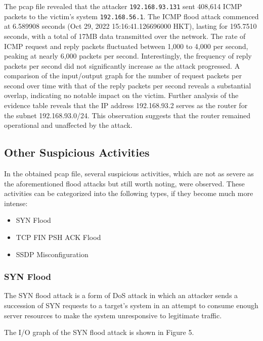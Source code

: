 \documentclass{article}
\begin{document}
    The pcap file revealed that the attacker \lstinline|192.168.93.131| sent 408,614 ICMP packets to the victim's system \lstinline|192.168.56.1|.
    The ICMP flood attack commenced at 6.589908 seconds (Oct 29, 2022 15:16:41.126696000 HKT), lasting for 195.7510 seconds, with a total of 17MB data transmitted over the network. 
    The rate of ICMP request and reply packets fluctuated between 1,000 to 4,000 per second, peaking at nearly 6,000 packets per second. 
    Interestingly, the frequency of reply packets per second did not significantly increase as the attack progressed. 
    A comparison of the input/output graph for the number of request packets per second over time with that of the reply packets per second reveals a substantial overlap, indicating no notable impact on the victim.
    Further analysis of the evidence table reveals that the IP address 192.168.93.2 serves as the router for the subnet 192.168.93.0/24. 
    This observation suggests that the router remained operational and unaffected by the attack.

    \subsection{\fontsize{14pt}{17pt}\selectfont Other Suspicious Activities}\label{subsec:other-suspicious-activities}
    In the obtained pcap file, several suspicious activities, 
    which are not as severe as the aforementioned flood attacks but still worth noting, were observed.
    These activities can be categorized into the following types, if they become much more intense:

    \begin{itemize}
        \item SYN Flood
        \item TCP FIN PSH ACK Flood
        \item SSDP Misconfiguration
    \end{itemize}

    \subsubsection{SYN Flood}\label{subsubsec:syn-flood}
    The SYN flood attack is a form of DoS attack in which an attacker sends a succession of SYN requests to a target's system in an attempt to consume enough server resources to make the system unresponsive to legitimate traffic.

    The I/O graph of the SYN flood attack is shown in Figure 5.
\end{document}
